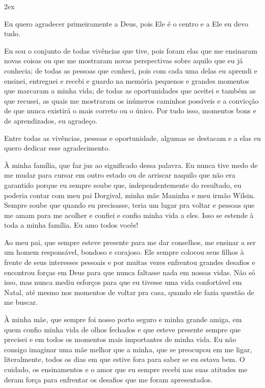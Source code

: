 \begin{trivlist}  \itemsep 2ex

  \item Eu quero agradecer primeiramente a Deus, pois Ele é o centro e a Ele eu devo tudo.

  \item Eu sou o conjunto de todas vivências que tive, pois foram elas que me ensinaram novas coisas ou que me mostraram novas perspectivas sobre aquilo que eu já conhecia; de todas as pessoas que conheci, pois com cada uma delas eu aprendi e ensinei, entreguei e recebi e guardo na memória pequenos e grandes momentos que marcaram a minha vida; de todas as oportunidades que aceitei e também as que recusei, as quais me mostraram os inúmeros caminhos possíveis e a convicção de que nunca existirá o mais correto ou o único. Por tudo isso, momentos bons e de aprendizados, eu agradeço.
  
  \item Entre todas as vivências, pessoas e oportunidade, algumas se destacam e a elas eu quero dedicar esse agradecimento.
  
  \item À minha família, que faz jus ao significado dessa palavra. Eu nunca tive medo de me mudar para cursar em outro estado ou de arriscar naquilo que não era garantido porque eu sempre soube que, independentemente do resultado, eu poderia contar com meu pai Dorgival, minha mãe Maninha e meu irmão Wilsin. Sempre soube que quando eu precisasse, teria um lugar pra voltar e pessoas que me amam para me acolher e confiei e confio minha vida a eles. Isso se estende à toda a minha família. Eu amo todos vocês!
  
  \item Ao meu pai, que sempre esteve presente para me dar conselhos, me ensinar a ser um homem responsável, bondoso e corajoso. Ele sempre colocou seus filhos à frente de seus interesses pessoais e por muitas vezes enfrentou grandes desafios e encontrou forças em Deus para que nunca faltasse nada em nossas vidas. Não só isso, mas nunca mediu esforços para que eu tivesse uma vida confortável em Natal, até mesmo nos momentos de voltar pra casa, quando ele fazia questão de me buscar.
  
  \item À minha mãe, que sempre foi nosso porto seguro e minha grande amiga, em quem confio minha vida de olhos fechados e que esteve presente sempre que precisei e em todos os momentos mais importantes de minha vida. Eu não consigo imaginar uma mãe melhor que a minha, que se preocupou em me ligar, literalmente, todos os dias em que estive fora para saber se eu estava bem. O cuidado, os ensinamentos e o amor que eu sempre recebi nas suas atitudes me deram força para enfrentar os desafios que me foram apresentados.


\end{trivlist}
